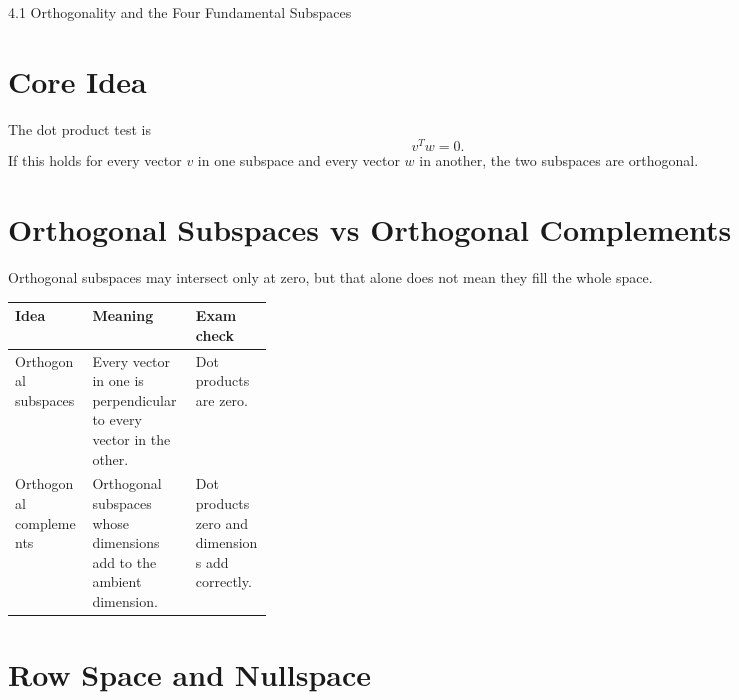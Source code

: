 \documentclass[10pt]{article}
\begin{document}
\begin{center}
{\LARGE 4.1 Orthogonality and the Four Fundamental Subspaces\par}
\end{center}

\section{Core Idea}


The dot product test is
\[
v^{T}w=0.
\]
If this holds for every vector \(v\) in one subspace and every vector \(w\) in another, the two subspaces are orthogonal.

\section{Orthogonal Subspaces vs Orthogonal Complements}

Orthogonal subspaces may intersect only at zero, but that alone does not mean they fill the whole space.

\begin{center}
\small
\begin{tabularx}{\linewidth}{@{}L{0.30\linewidth}Y Y@{}}
\toprule
Idea & Meaning & Exam check \\
\midrule
Orthogonal subspaces & Every vector in one is perpendicular to every vector in the other. & Dot products are zero. \\
Orthogonal complements & Orthogonal subspaces whose dimensions add to the ambient dimension. & Dot products zero and dimensions add correctly. \\
\bottomrule
\end{tabularx}
\end{center}


\section{Row Space and Nullspace}
\end{document}
